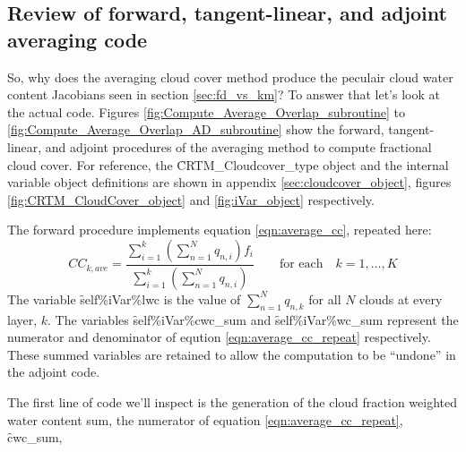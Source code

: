 \subsection{Review of forward, tangent-linear, and adjoint averaging code}

So, why does the averaging cloud cover method produce the peculair cloud water content Jacobians seen in section \ref{sec:fd_vs_km}? To answer that let's look at the actual code. Figures \ref{fig:Compute_Average_Overlap_subroutine} to \ref{fig:Compute_Average_Overlap_AD_subroutine} show the forward, tangent-linear, and adjoint procedures of the averaging method to compute fractional cloud cover. For reference, the \f{CRTM\_Cloudcover\_type} object and the internal variable object definitions are shown in appendix \ref{sec:cloudcover_object}, figures \ref{fig:CRTM_CloudCover_object} and \ref{fig:iVar_object} respectively.

The forward procedure implements equation \ref{eqn:average_cc}, repeated here:
\begin{equation}
  CC_{k,ave} = \frac{\displaystyle \sum_{i=1}^k{\left( \textstyle \sum_{n=1}^N{q_{n,i}} \right) f_i}}{\displaystyle \sum_{i=1}^k{\left( \textstyle \sum_{n=1}^N{q_{n,i}} \right)}}\qquad\mbox{for each}\quad k = 1,\ldots,K
  \label{eqn:average_cc_repeat}
\end{equation}
The variable \f{self\%iVar\%lwc} is the value of $\sum_{n=1}^N{q_{n,k}}$ for all $N$ clouds at every layer, $k$. The variables \f{self\%iVar\%cwc\_sum} and \f{self\%iVar\%wc\_sum} represent the numerator and denominator of eqution \ref{eqn:average_cc_repeat} respectively. These summed variables are retained to allow the computation to be ``undone'' in the adjoint code.

The first line of code we'll inspect is the generation of the cloud fraction weighted water content sum, the numerator of equation \ref{eqn:average_cc_repeat}, \f{cwc\_sum},

